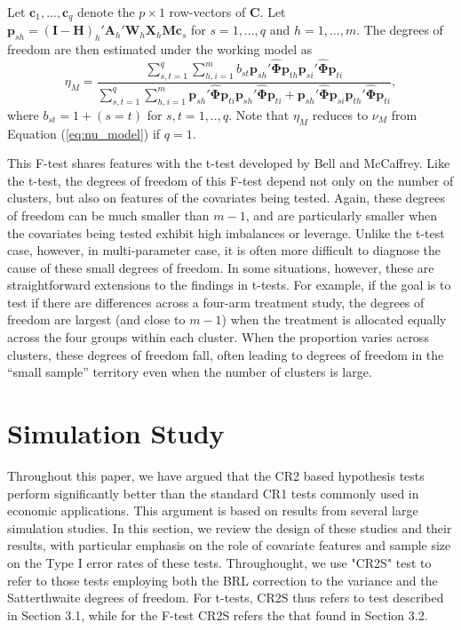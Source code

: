 \documentclass[12pt]{article}\usepackage[]{graphicx}\usepackage[]{color}
\newcommand{\bm}{\mathbf}
\newcommand{\bs}{\boldsymbol}
\begin{document}
Let $\bm{c}_1,...,\bm{c}_q$ denote the $p \times 1$ row-vectors of $\bm{C}$. 
Let $\bm{p}_{sh} = \left(\bm{I} - \bm{H}\right)_h'\bm{A}_h'\bm{W}_h\bm{X}_h\bm{M}\bm{c}_s$ for $s = 1,...,q$ and $h = 1,...,m$. 
The degrees of freedom are then estimated under the working model as
\begin{equation}
\label{eq:eta_model}
\eta_M = \frac{\sum_{s,t=1}^q \sum_{h,i=1}^m b_{st} \bm{p}_{sh}'\hat{\bs\Phi}\bm{p}_{th} \bm{p}_{si}'\hat{\bs\Phi}\bm{p}_{ti}}{\sum_{s,t=1}^q \sum_{h,i=1}^m \bm{p}_{sh}'\hat{\bs\Phi}\bm{p}_{ti} \bm{p}_{sh}'\hat{\bs\Phi}\bm{p}_{ti} + \bm{p}_{sh}'\hat{\bs\Phi}\bm{p}_{si} \bm{p}_{th}'\hat{\bs\Phi}\bm{p}_{ti}},
\end{equation}
where $b_{st} = 1 + (s=t)$ for $s,t=1,..,q$.
Note that $\eta_M$ reduces to $\nu_M$ from Equation (\ref{eq:nu_model}) if $q = 1$.

This F-test shares features with the t-test developed by Bell and McCaffrey. Like the t-test, the degrees of freedom of this F-test depend not only on the number of clusters, but also on features of the covariates being tested. 
Again, these degrees of freedom can be much smaller than $m - 1$, and are particularly smaller when the covariates being tested exhibit high imbalances or leverage. 
Unlike the t-test case, however, in multi-parameter case, it is often more difficult to diagnose the cause of these small degrees of freedom. 
In some situations, however, these are straightforward extensions to the findings in t-tests. 
For example, if the goal is to test if there are differences across a four-arm treatment study, the degrees of freedom are largest (and close to $m - 1$) when the treatment is allocated equally across the four groups within each cluster. 
When the proportion varies across clusters, these degrees of freedom fall, often leading to degrees of freedom in the ``small sample'' territory even when the number of clusters is large. 

\section{Simulation Study}



Throughout this paper, we have argued that the CR2 based hypothesis tests perform significantly better than the standard CR1 tests commonly used in economic applications. 
This argument is based on results from several large simulation studies. 
In this section, we review the design of these studies and their results, with particular emphasis on the role of covariate features and sample size on the Type I error rates of these tests.
Throughought, we use "CR2S" test to refer to those tests employing both the BRL correction to the variance and the Satterthwaite degrees of freedom. For t-tests, CR2S thus refers to test described in Section 3.1, while for the F-test CR2S refers the that found in Section 3.2. 
\end{document}
